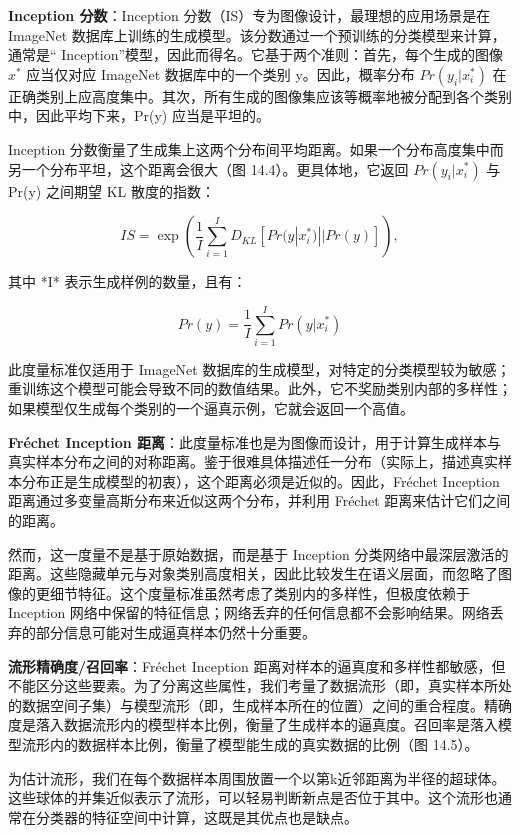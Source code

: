 \documentclass[lang=cn,newtx,10pt,scheme=chinese]{elegantbook}
\begin{document}
\textbf{Inception 分数}：Inception 分数（IS）专为图像设计，最理想的应用场景是在 ImageNet 数据库上训练的生成模型。该分数通过一个预训练的分类模型来计算，通常是“ Inception”模型，因此而得名。它基于两个准则：首先，每个生成的图像 \(x^*\) 应当仅对应 ImageNet 数据库中的一个类别 y。因此，概率分布 \(Pr(y_i|x^*_i)\) 在正确类别上应高度集中。其次，所有生成的图像集应该等概率地被分配到各个类别中，因此平均下来，Pr(y) 应当是平坦的。

Inception 分数衡量了生成集上这两个分布间平均距离。如果一个分布高度集中而另一个分布平坦，这个距离会很大（图 14.4）。更具体地，它返回 \(Pr(y_i|x^*_i)\) 与 Pr(y) 之间期望 KL 散度的指数：

\begin{equation}
IS = \exp \left( \frac{1}{I} \sum_{i=1}^{I} D_{KL} [ Pr(y|x_i^*) || Pr(y) ] \right),
\end{equation}

其中 *I* 表示生成样例的数量，且有：

\begin{equation}
Pr(y) = \frac{1}{I} \sum_{i=1}^{I} Pr(y|x_i^*)
\end{equation}

此度量标准仅适用于 ImageNet 数据库的生成模型，对特定的分类模型较为敏感；重训练这个模型可能会导致不同的数值结果。此外，它不奖励类别内部的多样性；如果模型仅生成每个类别的一个逼真示例，它就会返回一个高值。

\textbf{Fréchet Inception 距离}：此度量标准也是为图像而设计，用于计算生成样本与真实样本分布之间的对称距离。鉴于很难具体描述任一分布（实际上，描述真实样本分布正是生成模型的初衷），这个距离必须是近似的。因此，Fréchet Inception 距离通过多变量高斯分布来近似这两个分布，并利用 Fréchet 距离来估计它们之间的距离。

然而，这一度量不是基于原始数据，而是基于 Inception 分类网络中最深层激活的距离。这些隐藏单元与对象类别高度相关，因此比较发生在语义层面，而忽略了图像的更细节特征。这个度量标准虽然考虑了类别内的多样性，但极度依赖于 Inception 网络中保留的特征信息；网络丢弃的任何信息都不会影响结果。网络丢弃的部分信息可能对生成逼真样本仍然十分重要。

\textbf{流形精确度/召回率}：Fréchet Inception 距离对样本的逼真度和多样性都敏感，但不能区分这些要素。为了分离这些属性，我们考量了数据流形（即，真实样本所处的数据空间子集）与模型流形（即，生成样本所在的位置）之间的重合程度。精确度是落入数据流形内的模型样本比例，衡量了生成样本的逼真度。召回率是落入模型流形内的数据样本比例，衡量了模型能生成的真实数据的比例（图 14.5）。

为估计流形，我们在每个数据样本周围放置一个以第k近邻距离为半径的超球体。这些球体的并集近似表示了流形，可以轻易判断新点是否位于其中。这个流形也通常在分类器的特征空间中计算，这既是其优点也是缺点。
\end{document}
